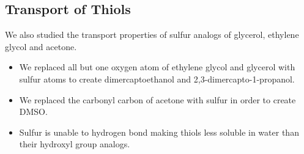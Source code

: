 \documentclass{article}
\begin{document}
  \subsection*{Transport of Thiols}
  
  We also studied the transport properties of sulfur analogs of glycerol, ethylene
  glycol and acetone.
  \begin{itemize}
    \item We replaced all but one oxygen atom of ethylene glycol and glycerol with sulfur atoms
    to create dimercaptoethanol and 2,3-dimercapto-1-propanol.
    \item We replaced the carbonyl carbon of acetone with sulfur in order to create DMSO. 
  	\item Sulfur is unable to hydrogen bond making thiols less soluble in water than
  	their hydroxyl group analogs.  %
 \end{itemize}
  
\end{document}

